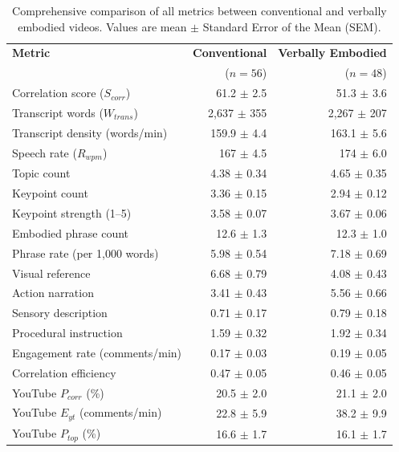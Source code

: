 \begin{table}[h!]
    \centering
    \caption{Comprehensive comparison of all metrics between conventional and verbally embodied videos. Values are mean $\pm$ Standard Error of the Mean (SEM).}
    \begin{tabular}{l r r}
        \toprule
        \textbf{Metric} & \textbf{Conventional} & \textbf{Verbally Embodied} \\
        & ($n = 56$) & ($n = 48$) \\
        \midrule
        Correlation score ($S_{corr}$) & 61.2 $\pm$ 2.5 & 51.3 $\pm$ 3.6 \\
        Transcript words ($W_{trans}$) & 2{,}637 $\pm$ 355 & 2{,}267 $\pm$ 207 \\
        Transcript density (words/min) & 159.9 $\pm$ 4.4 & 163.1 $\pm$ 5.6 \\
        Speech rate ($R_{wpm}$) & 167 $\pm$ 4.5 & 174 $\pm$ 6.0 \\
        Topic count & 4.38 $\pm$ 0.34 & 4.65 $\pm$ 0.35 \\
        Keypoint count & 3.36 $\pm$ 0.15 & 2.94 $\pm$ 0.12 \\
        Keypoint strength (1--5) & 3.58 $\pm$ 0.07 & 3.67 $\pm$ 0.06 \\
        Embodied phrase count & 12.6 $\pm$ 1.3 & 12.3 $\pm$ 1.0 \\
        Phrase rate (per 1{,}000 words) & 5.98 $\pm$ 0.54 & 7.18 $\pm$ 0.69 \\
        Visual reference & 6.68 $\pm$ 0.79 & 4.08 $\pm$ 0.43 \\
        Action narration & 3.41 $\pm$ 0.43 & 5.56 $\pm$ 0.66 \\
        Sensory description & 0.71 $\pm$ 0.17 & 0.79 $\pm$ 0.18 \\
        Procedural instruction & 1.59 $\pm$ 0.32 & 1.92 $\pm$ 0.34 \\
        Engagement rate (comments/min) & 0.17 $\pm$ 0.03 & 0.19 $\pm$ 0.05 \\
        Correlation efficiency & 0.47 $\pm$ 0.05 & 0.46 $\pm$ 0.05 \\
        YouTube $P_{corr}$ (\%) & 20.5 $\pm$ 2.0 & 21.1 $\pm$ 2.0 \\
        YouTube $E_{yt}$ (comments/min) & 22.8 $\pm$ 5.9 & 38.2 $\pm$ 9.9 \\
        YouTube $P_{top}$ (\%) & 16.6 $\pm$ 1.7 & 16.1 $\pm$ 1.7 \\
        \bottomrule
    \end{tabular}
    \label{tab:full_comparison}
\end{table}

